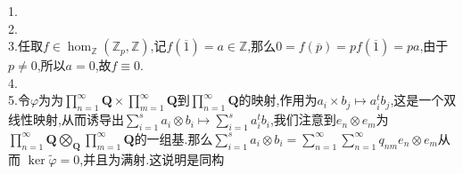 \documentclass[a4paper]{ctexart}
\newcommand{\ts}[2]{#1\otimes #2}
\begin{document}
\pagestyle{plain}
\noindent
{}
1.\\
2.\\
3.任取$f\in \hom_{\mathbb{Z}}(\mathbb{Z}_p,\mathbb{Z})$,记$f(\overline{1})=a\in \mathbb{Z}$,那么$0=f(\overline{p})=pf(\overline{1})=pa$,由于$p\neq 0$,所以$a=0$,故$f\equiv 0$.\\
4.\\
5.令$\varphi$为为$\prod\limits_{n=1}^\infty \mathbf{Q}\times\prod\limits_{m=1}^\infty \mathbf{Q}$到$\prod\limits_{n=1}^\infty \mathbf{Q}$的映射,作用为$a_i\times b_j\mapsto a_i^tb_j$,这是一个双线性映射,从而诱导出$\sum\limits_{i=1}^s\ts{a_i}{b_i}\mapsto \sum\limits_{i=1}^sa_i^tb_i$,我们注意到$\ts{e_n}{e_m}$为$\prod\limits_{n=1}^\infty \mathbf{Q}\bigotimes_{\mathbf{Q}}\prod\limits_{m=1}^\infty \mathbf{Q}$的一组基.那么$\sum\limits_{i=1}^s\ts{a_i}{b_i}=\sum\limits_{n=1}^\infty\sum\limits_{n=1}^\infty q_{nm}\ts{e_n}{e_m}$从而
$\ker\tilde{\varphi}=0$,并且为满射.这说明是同构
\end{document}
